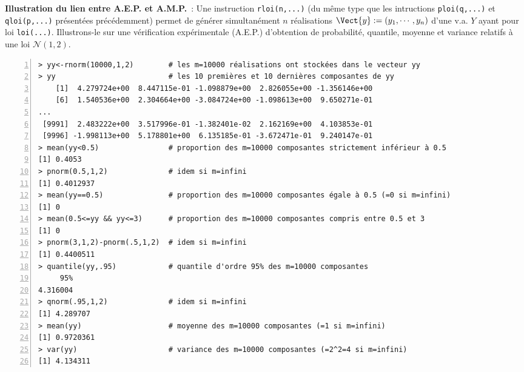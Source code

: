 \documentclass[10pt]{article}
\begin{document}
\noindent\textbf{Illustration du lien entre A.E.P. et A.M.P.}~: 
Une instruction \texttt{rloi(n,...)} (du même type que les intructions \texttt{ploi(q,...)} et \texttt{qloi(p,...)} présentées précédemment) permet de générer simultanément $n$ réalisations $\Vect{y}:=(y_1,\cdots,y_n)$ d'une v.a. $Y$ ayant pour loi \texttt{loi(...)}. Illustrons-le sur une vérification expérimentale (A.E.P.) d'obtention de probabilité, quantile, moyenne et variance relatifs à une loi $\mathcal{N}(1,2)$.  
\begin{Verbatim}[frame=leftline,fontfamily=tt,fontshape=n,numbers=left]
> yy<-rnorm(10000,1,2)        # les m=10000 réalisations ont stockées dans le vecteur yy
> yy                          # les 10 premières et 10 dernières composantes de yy
    [1]  4.279724e+00  8.447115e-01 -1.098879e+00  2.826055e+00 -1.356146e+00
    [6]  1.540536e+00  2.304664e+00 -3.084724e+00 -1.098613e+00  9.650271e-01
...
 [9991]  2.483222e+00  3.517996e-01 -1.382401e-02  2.162169e+00  4.103853e-01
 [9996] -1.998113e+00  5.178801e+00  6.135185e-01 -3.672471e-01  9.240147e-01
> mean(yy<0.5)                # proportion des m=10000 composantes strictement inférieur à 0.5
[1] 0.4053
> pnorm(0.5,1,2)              # idem si m=infini
[1] 0.4012937
> mean(yy==0.5)               # proportion des m=10000 composantes égale à 0.5 (=0 si m=infini)
[1] 0
> mean(0.5<=yy && yy<=3)      # proportion des m=10000 composantes compris entre 0.5 et 3
[1] 0
> pnorm(3,1,2)-pnorm(.5,1,2)  # idem si m=infini
[1] 0.4400511
> quantile(yy,.95)            # quantile d'ordre 95% des m=10000 composantes
     95% 
4.316004 
> qnorm(.95,1,2)              # idem si m=infini
[1] 4.289707
> mean(yy)                    # moyenne des m=10000 composantes (=1 si m=infini)
[1] 0.9720361
> var(yy)                     # variance des m=10000 composantes (=2^2=4 si m=infini)
[1] 4.134311
\end{Verbatim}
\end{document}
